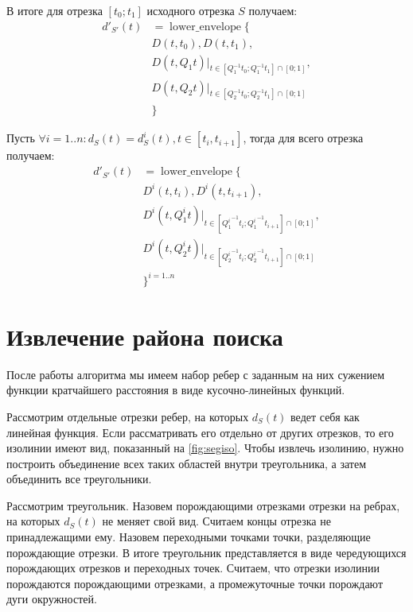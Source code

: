 В итоге для отрезка $[t_0; t_1]$ исходного отрезка $S$ получаем:
\begin{equation}
\begin{aligned}
d'_{S'}(t) &= \mathop{lower\_envelope}\{\\
&D(t, t_0), D(t, t_1),\\
&D(t, Q_1t)|_{t \in [Q_1^{-1}t_0; Q_1^{-1}t_1] \cap [0; 1]},\\
&D(t, Q_2t)|_{t \in [Q_2^{-1}t_0; Q_2^{-1}t_1] \cap [0; 1]}\\
&\}
\end{aligned}
\end{equation}

Пусть $\forall i = 1..n: d_S(t) = d^i_S(t), t \in [t_i, t_{i+1}]$,
тогда для всего отрезка получаем:
\begin{equation}
\begin{aligned}
d'_{S'}(t) &= \mathop{lower\_envelope}\{\\
&D^i(t, t_i), D^i(t, t_{i+1}),\\
&D^i(t, Q^i_1t)|_{t \in [{Q^i_1}^{-1}t_i; {Q^i_1}^{-1}t_{i+1}] \cap [0; 1]},\\
&D^i(t, Q^i_2t)|_{t \in [{Q^i_2}^{-1}t_i; {Q^i_2}^{-1}t_{i+1}] \cap [0; 1]}\\
&\}^{i=1..n}
\end{aligned}
\end{equation}



\section{Извлечение района поиска}
После работы алгоритма мы имеем набор ребер с заданным
на них сужением функции кратчайшего расстояния в виде кусочно-линейных
функций.

Рассмотрим отдельные отрезки ребер, на которых $d_S(t)$ ведет себя как
линейная функция. Если рассматривать его отдельно от других отрезков,
то его изолинии имеют вид, показанный на \ref{fig:segiso}.
Чтобы извлечь изолинию, нужно построить объединение всех таких
областей внутри треугольника, а затем объединить все треугольники.

Рассмотрим треугольник. Назовем порождающими отрезками отрезки на ребрах,
на которых $d_S(t)$ не меняет свой вид. Считаем концы отрезка не
принадлежащими ему. Назовем переходными точками точки,
разделяющие порождающие отрезки. В итоге треугольник представляется в виде
чередующихся порождающих отрезков и переходных точек. Считаем,
что отрезки изолинии порождаются порождающими отрезками, а
промежуточные точки порождают дуги окружностей.

